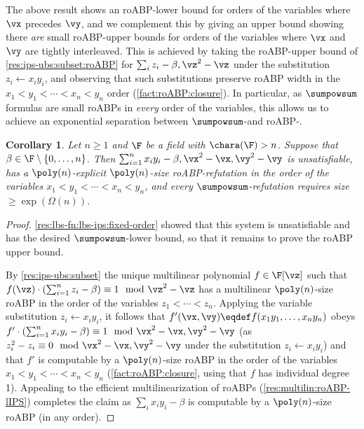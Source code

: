 \documentclass[11pt]{article}
\numberwithin{equation}{section}
\newtheorem{corollary}[theorem]{Corollary}
\theoremstyle{definition}
\theoremstyle{plain}
\begin{document}
The above result shows an roABP-\lIPS lower bound for orders of the variables where $\vx$ precedes $\vy$, and we complement this by giving an upper bound showing there \emph{are} small roABP-\lIPS upper bounds for orders of the variables where $\vx$ and $\vy$ are tightly interleaved.  This is achieved by taking the roABP-\lIPS upper bound of \autoref{res:ips-ubs:subset:roABP} for $\sum_i z_i-\beta,\vz^2-\vz$ under the substitution $z_i\leftarrow x_iy_i$, and observing that such substitutions preserve roABP width in the $x_1<y_1<\cdots<x_n<y_n$ order (\autoref{fact:roABP:closure}). In particular, as $\sumpowsum$ formulas are small roABPs in \emph{every} order of the variables, this allows us to achieve an exponential separation between $\sumpowsum$-\lIPS and roABP-\lIPS.

\begin{corollary}\label{res:lbs-fn:lbs-ips:order-sep}
        Let $n\ge 1$ and $\F$ be a field with $\chara(\F)>n$.  Suppose that $\beta\in \F\setminus\{0,\ldots,n\}$.  Then $\sum_{i=1}^n x_iy_i-\beta,\vx^2-\vx,\vy^2-\vy$ is unsatisfiable, has a $\poly(n)$-explicit $\poly(n)$-size roABP-\lIPS refutation in the order of the variables $x_1<y_1<\cdots<x_n<y_n$, and every $\sumpowsum$-\lIPS refutation requires size $\ge\exp(\Omega(n))$.
\end{corollary}
\begin{proof}
        \autoref{res:lbs-fn:lbs-ips:fixed-order} showed that this system is unsatisfiable and has the desired $\sumpowsum$-\lIPS lower bound, so that it remains to prove the roABP upper bound.

        By \autoref{res:ips-ubs:subset} the unique multilinear polynomial $f\in\F[\vz]$ such that $f(\vz)\cdot (\sum_{i=1}^nz_i-\beta)\equiv 1\mod \vz^2-\vz$ has a multilinear $\poly(n)$-size roABP in the order of the variables $z_1<\cdots<z_n$. Applying the variable substitution $z_i\leftarrow x_iy_i$, it follows that $f'(\vx,\vy)\eqdef f(x_1y_1,\ldots,x_ny_n)$ obeys $f'\cdot (\sum_{i=1}^nx_iy_i-\beta)\equiv 1 \mod \vx^2-\vx,\vy^2-\vy$ (as $z_i^2-z_i\equiv 0 \mod \vx^2-\vx,\vy^2-\vy$ under the substitution $z_i\leftarrow x_iy_i$) and that $f'$ is computable by a $\poly(n)$-size roABP in the order of the variables $x_1<y_1<\cdots<x_n<y_n$ (\autoref{fact:roABP:closure}, using that $f$ has individual degree 1).  Appealing to the efficient multilinearization of roABPs (\autoref{res:multilin:roABP-lIPS}) completes the claim as $\sum_i x_iy_i -\beta$ is computable by a $\poly(n)$-size roABP (in any order).
\end{proof}
\end{document}
